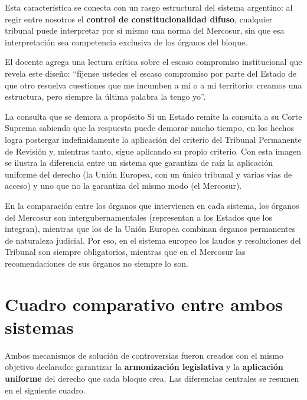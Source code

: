 \documentclass[12pt,oneside]{book}
\begin{document}
Esta característica se conecta con un rasgo estructural del sistema argentino: al regir entre nosotros el \textbf{control de constitucionalidad difuso}, cualquier tribunal puede interpretar por sí mismo una norma del Mercosur, sin que esa interpretación sea competencia exclusiva de los órganos del bloque.

El docente agrega una lectura crítica sobre el escaso compromiso institucional que revela este diseño: “fíjense ustedes el escaso compromiso por parte del Estado de que otro resuelva cuestiones que me incumben a mí o a mi territorio: creamos una estructura, pero siempre la última palabra la tengo yo”.

\begin{example}{La consulta que se demora a propósito}
Si un Estado remite la consulta a su Corte Suprema sabiendo que la respuesta puede demorar mucho tiempo, en los hechos logra postergar indefinidamente la aplicación del criterio del Tribunal Permanente de Revisión y, mientras tanto, sigue aplicando su propio criterio. Con esta imagen se ilustra la diferencia entre un sistema que garantiza de raíz la aplicación uniforme del derecho (la Unión Europea, con un único tribunal y varias vías de acceso) y uno que no la garantiza del mismo modo (el Mercosur).
\end{example}

En la comparación entre los órganos que intervienen en cada sistema, los órganos del Mercosur son intergubernamentales (representan a los Estados que los integran), mientras que los de la Unión Europea combinan órganos permanentes de naturaleza judicial. Por eso, en el sistema europeo los laudos y resoluciones del Tribunal son siempre obligatorios, mientras que en el Mercosur las recomendaciones de sus órganos no siempre lo son.

\section{Cuadro comparativo entre ambos sistemas}

Ambos mecanismos de solución de controversias fueron creados con el mismo objetivo declarado: garantizar la \textbf{armonización legislativa} y la \textbf{aplicación uniforme} del derecho que cada bloque crea. Las diferencias centrales se resumen en el siguiente cuadro.
\end{document}
